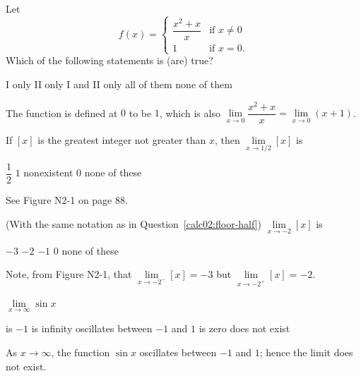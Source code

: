 \newpage

\question
Let
\[
f(x)=\begin{cases}\dfrac{x^{2}+x}{x} & \text{if } x \neq 0 \\ 1 & \text{if } x=0.\end{cases}
\]
Which of the following statements is (are) true?
\begin{choices}
  \choice I only
  \choice II only
  \choice I and II only
  \CorrectChoice all of them
  \choice none of them
\end{choices}
\begin{solution}
The function is defined at $0$ to be $1$, which is also $\lim\limits_{x \to 0} \dfrac{x^{2}+x}{x}=\lim\limits_{x \to 0}(x+1)$.
\end{solution}

\question\label{calc02:floor-half}
If $[x]$ is the greatest integer not greater than $x$, then $\lim\limits_{x \to 1/2}[x]$ is
\begin{choices}
  \choice $\dfrac{1}{2}$
  \choice $1$
  \choice nonexistent
  \CorrectChoice $0$
  \choice none of these
\end{choices}
\begin{solution}
See Figure N2-1 on page 88.
\end{solution}

\question
(With the same notation as in Question~\ref{calc02:floor-half}) $\lim\limits_{x \to -2}[x]$ is
\begin{choices}
  \choice $-3$
  \choice $-2$
  \choice $-1$
  \choice $0$
  \CorrectChoice none of these
\end{choices}
\begin{solution}
Note, from Figure N2-1, that $\lim\limits_{x \to -2^{-}}[x]=-3$ but $\lim\limits_{x \to -2^{+}}[x]=-2$.
\end{solution}


\newpage

\question
$\lim\limits_{x \to \infty} \sin x$
\begin{choices}
  \choice is $-1$
  \choice is infinity
  \choice oscillates between $-1$ and $1$
  \choice is zero
  \CorrectChoice does not exist
\end{choices}
\begin{solution}
As $x \rightarrow \infty$, the function $\sin x$ oscillates between $-1$ and $1$; hence the limit does not exist.
\end{solution}

